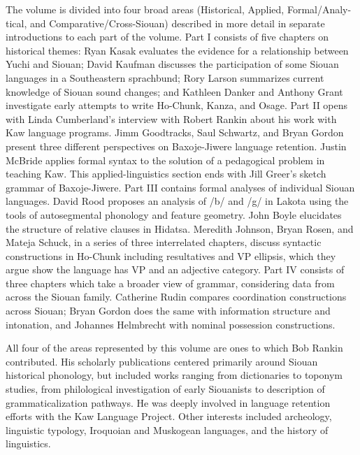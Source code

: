 \begin{refsection}
The volume is divided into four broad areas (Historical, Applied, Formal/Analy-tical, and Comparative/Cross-Siouan) described in more detail in separate introductions to each part of the volume. Part I consists of five chapters on historical themes: Ryan Kasak evaluates the evidence for a relationship between Yuchi and Siouan; David Kaufman discusses the participation of some Siouan languages in a Southeastern sprachbund; Rory Larson summarizes current knowledge of Siouan sound changes; and Kathleen Danker and Anthony Grant investigate early attempts to write Ho-Chunk, Kanza, and Osage.  Part II opens with Linda Cumberland's interview with Robert Rankin about his work with Kaw language programs. Jimm Goodtracks, Saul Schwartz, and Bryan Gordon present three different perspectives on Baxoje-Jiwere language retention. Justin McBride applies formal syntax to the solution of a pedagogical problem in teaching Kaw. This applied-linguistics section ends with Jill Greer's sketch grammar of Baxoje-Jiwere. Part III contains formal analyses of individual Siouan languages. David Rood proposes an analysis of /b/ and /g/ in Lakota using the tools of autosegmental phonology and feature geometry. John Boyle elucidates the structure of relative clauses in Hidatsa. Meredith Johnson, Bryan Rosen, and Mateja Schuck, in a series of three interrelated chapters, discuss syntactic constructions in Ho-Chunk including resultatives and VP ellipsis, which they argue show the language has VP and an adjective category. Part IV consists of three chapters which take a broader view of grammar, considering data from across the Siouan family. Catherine Rudin compares coordination constructions across Siouan; Bryan Gordon does the same with information structure and intonation, and Johannes Helmbrecht with nominal possession constructions. 

All four of the areas represented by this volume are ones to which Bob Rankin contributed. His scholarly publications centered primarily around Siouan historical phonology, but included works ranging from dictionaries to toponym studies, from philological investigation of early Siouanists  to description of grammaticalization pathways. He was deeply involved in language retention efforts with the Kaw Language Project. Other interests included archeology, linguistic typology, Iroquoian and Muskogean languages, and the history of linguistics. 


\end{refsection}
